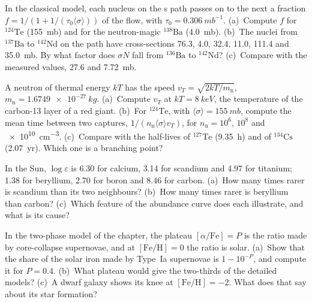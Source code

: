 \begin{exercise}[$\star\star$]\label{exo:b3:origin-of-elements:6}
In the classical model, each nucleus on the s path passes on to the
next a fraction $f = 1/(1 + 1/(\tau_0\langle\sigma\rangle))$ of the
flow, with $\tau_0 = \qty{0.306}{mb^{-1}}$. (a)~Compute $f$ for
$^{124}\mathrm{Te}$ (\qty{155}{mb}) and for the neutron-magic
$^{138}\mathrm{Ba}$ (\qty{4.0}{mb}). (b)~The nuclei from
$^{137}\mathrm{Ba}$ to $^{142}\mathrm{Nd}$ on the path have
cross-sections \num{76.3}, \num{4.0}, \num{32.4}, \num{11.0},
\num{111.4} and \qty{35.0}{mb}. By what factor does $\sigma N$ fall from
$^{136}\mathrm{Ba}$ to $^{142}\mathrm{Nd}$? (c)~Compare with the
measured values, \num{27.6} and \qty{7.72}{mb}.
\end{exercise}

\begin{exercise}[$\star\star$]\label{exo:b3:origin-of-elements:7}
A neutron of thermal energy $kT$ has the speed
$v_T = \sqrt{2kT/m_\mathrm{n}}$, $m_\mathrm{n} = \qty{1.6749e-27}{kg}$.
(a)~Compute $v_T$ at $kT = \qty{8}{keV}$, the temperature of the
carbon-13 layer of a red giant. (b)~For $^{124}\mathrm{Te}$, with
$\langle\sigma\rangle = \qty{155}{mb}$, compute the mean time between
two captures, $1/(n_\mathrm{n}\langle\sigma\rangle v_T)$, for
$n_\mathrm{n} = 10^6$, $10^8$ and \qty{e10}{cm^{-3}}. (c)~Compare with
the half-lives of $^{127}\mathrm{Te}$ (\qty{9.35}{h}) and of
$^{134}\mathrm{Cs}$ (\qty{2.07}{yr}). Which one is a branching point?
\end{exercise}

\begin{exercise}[$\star\star$]\label{exo:b3:origin-of-elements:8}
In the Sun, $\log\varepsilon$ is \num{6.30} for calcium, \num{3.14} for
scandium and \num{4.97} for titanium; \num{1.38} for beryllium,
\num{2.70} for boron and \num{8.46} for carbon. (a)~How many times
rarer is scandium than its two neighbours? (b)~How many times rarer is
beryllium than carbon? (c)~Which feature of the abundance curve does
each illustrate, and what is its cause?
\end{exercise}

\begin{exercise}[$\star\star$]\label{exo:b3:origin-of-elements:9}
In the two-phase model of the chapter, the plateau
$[\alpha/\mathrm{Fe}] = P$ is the ratio made by core-collapse supernovae,
and at $[\mathrm{Fe/H}] = 0$ the ratio is solar. (a)~Show that the share
of the solar iron made by Type~Ia supernovae is $1 - 10^{-P}$, and
compute it for $P = 0.4$. (b)~What plateau would give the two-thirds of
the detailed models? (c)~A dwarf galaxy shows its knee at
$[\mathrm{Fe/H}] = -2$. What does that say about its star formation?
\end{exercise}

